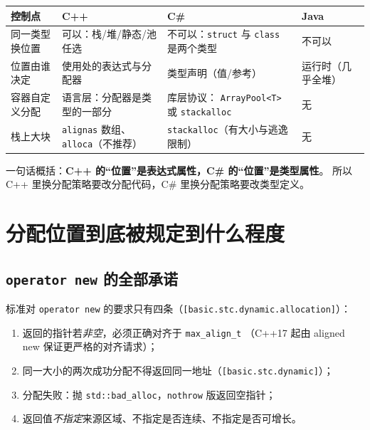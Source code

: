 \documentclass[12pt,a4paper,fontset=fandol]{ctexbook}
\begin{document}
\begin{compare}[title=两种``位置控制''的对比]
\begin{tabular}{@{}>{\raggedright\arraybackslash}p{}>{\raggedright\arraybackslash}p{}>{\raggedright\arraybackslash}p{}>{\raggedright\arraybackslash}p{}@{}}
\toprule
\textbf{控制点} & \textbf{C++} & \textbf{C\#} & \textbf{Java} \\
\midrule
同一类型换位置 & 可以：栈/堆/静态/池任选 & 不可以：\texttt{struct} 与
  \texttt{class} 是两个类型 & 不可以 \\
\addlinespace
位置由谁决定 & 使用处的表达式与分配器 & 类型声明（值/参考） &
  运行时（几乎全堆） \\
\addlinespace
容器自定义分配 & 语言层：分配器是类型的一部分 & 库层协议：
  \texttt{ArrayPool<T>} 或 \texttt{stackalloc} & 无 \\
\addlinespace
栈上大块 & \texttt{alignas} 数组、\texttt{alloca}（不推荐） &
  \texttt{stackalloc}（有大小与逃逸限制） & 无 \\
\bottomrule
\end{tabular}
\end{compare}

一句话概括：\textbf{C++ 的``位置''是表达式属性，C\# 的``位置''是类型属性}。
所以 C++ 里换分配策略要改分配代码，C\# 里换分配策略要改类型定义。

\section{分配位置到底被规定到什么程度}

\subsection{\texttt{operator new} 的全部承诺}

标准对 \texttt{operator new} 的要求只有四条（\texttt{[basic.stc.dynamic.allocation]}）：

\begin{enumerate}
  \item 返回的指针若\emph{非空}，必须正确对齐于 \texttt{max\_align\_t}
        （C++17 起由 aligned new 保证更严格的对齐请求）；
  \item 同一大小的两次成功分配不得返回同一地址（\texttt{[basic.stc.dynamic]}）；
  \item 分配失败：抛 \texttt{std::bad\_alloc}，\texttt{nothrow} 版返回空指针；
  \item 返回值\emph{不指定}来源区域、不指定是否连续、不指定是否可增长。
\end{enumerate}
\end{document}

